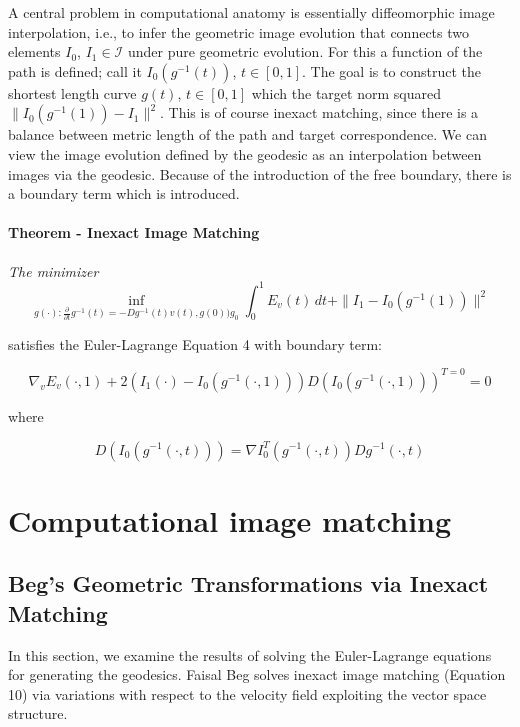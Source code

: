 \documentclass[final, paper=letter,5p,times,twocolumn]{elsarticle}
\newcommand{\CA}{computational anatomy}
\theoremstyle{definition}
\begin{document}
A central problem in \CA{} is essentially diffeomorphic image interpolation, i.e., to infer the geometric image evolution that connects two elements $I_{0}$, $I_{1} \in \mathcal{I}$ under pure geometric evolution. For this a function of the path is defined; call it $I_{0}(g^{−1}(t))$, $t \in [0, 1]$. The goal is to construct the shortest length curve $g(t)$, $t \in [0, 1]$ which  the target norm squared $\| I_{0} (g^{−1}(1)) − I_{1} \|^{2}$. This is of course inexact matching, since there is a balance between metric length of the path and target correspondence. We can view the image evolution defined by the geodesic as an interpolation between images via the geodesic. Because of the introduction of the free boundary, there is a boundary term which is introduced.

\paragraph{Theorem - Inexact Image Matching}{\it The minimizer
$$
\underset{g(\cdot): \frac{\partial}{\partial t} g^{-1}(t) = - Dg^{-1}(t)v(t), g(0) ) g_{0}}{\inf} \int_{0}^{1} E_{v}(t) \, dt + \| I_{1} - I_{0}(g^{-1}(1))\|^{2}
$$

satisfies the Euler-Lagrange Equation 4 with boundary term:

$$
\nabla_{v}E_{v}(\cdot, 1) + 2(I_{1}(\cdot) - I_{0}(g^{-1}(\cdot, 1)))D(I_{0}(g^{-1}(\cdot, 1)))^{T = 0} = 0
$$

where

$$
D(I_{0}(g^{-1}(\cdot,t))) = \nabla I_{0}^{T}(g^{-1}(\cdot, t))Dg^{-1}(\cdot, t)
$$
}




\section{Computational image matching}

\subsection{Beg's Geometric Transformations via Inexact Matching}


In this section, we examine the results of solving the Euler-Lagrange equations for generating the geodesics. Faisal Beg solves inexact image matching (Equation 10) via variations with respect to the velocity field exploiting the vector space structure.
\end{document}
